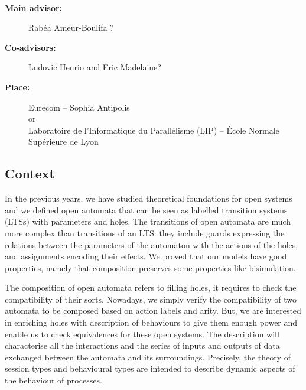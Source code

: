 \documentclass[11pt,fleqn]{article}
\begin{document}
\begin{center}
\\\bigskip
{}
\end{center}
\medskip

\begin{description}
\item[\bf Main advisor:] Rabéa Ameur-Boulifa ?
\item[\bf Co-advisors:] Ludovic Henrio and Eric Madelaine?
\item[\bf Place:] Eurecom  -- Sophia Antipolis
\\
or\\
Laboratoire de l'Informatique du Parallélisme (LIP) --
  \'Ecole Normale Supérieure de Lyon
\end{description}

\subsection*{Context}




In the previous years, we have studied theoretical foundations for open
systems and we defined  open automata \cite{arxiv-weakbisim,henrio:Forte2016,hou:hal-02406098} that can be seen as labelled transition systems (LTSs) with parameters and holes. The transitions of open
automata are much more complex than transitions of an LTS: they include guards expressing the relations between the parameters of the automaton with the actions of the holes, and assignments encoding their effects.
 We proved that our models 
have good properties, namely that composition preserves some properties like bisimulation.



The composition of open automata refers to filling holes, it requires to check the compatibility of their sorts. Nowadays, we simply verify the compatibility of two automata to be composed based on   action labels and  arity. But, 
 we are interested in enriching holes with description of behaviours to give them enough power and enable us to check equivalences for these open systems. The description will characterise all the
interactions and the series of inputs and outputs of data exchanged between the automata and its surroundings. Precisely, the theory of session types and behavioural types  \cite{Fantechi:MLTCDP2019} are intended  to describe dynamic aspects of the behaviour of processes.
\end{document}
